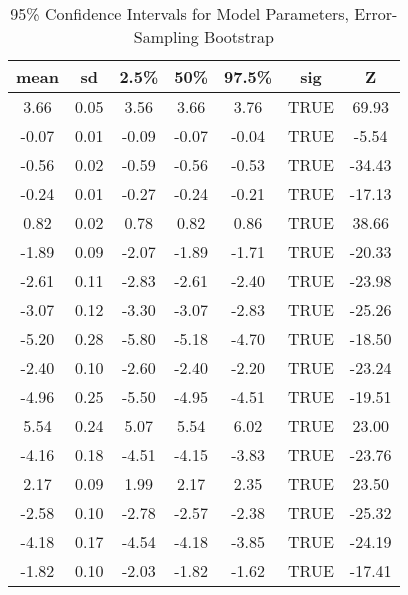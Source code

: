 \begin{table}[hbp!]
\centering
\begin{tabular}{|c|c|c|c|c|c|c|}
  \hline
\textbf{mean} & \textbf{sd} & \textbf{2.5\%} & \textbf{50\%} & \textbf{97.5\%} & \textbf{sig} & \textbf{Z} \\ 
  \hline
3.66 & 0.05 & 3.56 & 3.66 & 3.76 & TRUE & 69.93 \\ 
  -0.07 & 0.01 & -0.09 & -0.07 & -0.04 & TRUE & -5.54 \\ 
  -0.56 & 0.02 & -0.59 & -0.56 & -0.53 & TRUE & -34.43 \\ 
  -0.24 & 0.01 & -0.27 & -0.24 & -0.21 & TRUE & -17.13 \\ 
  0.82 & 0.02 & 0.78 & 0.82 & 0.86 & TRUE & 38.66 \\ 
  -1.89 & 0.09 & -2.07 & -1.89 & -1.71 & TRUE & -20.33 \\ 
  -2.61 & 0.11 & -2.83 & -2.61 & -2.40 & TRUE & -23.98 \\ 
  -3.07 & 0.12 & -3.30 & -3.07 & -2.83 & TRUE & -25.26 \\ 
  -5.20 & 0.28 & -5.80 & -5.18 & -4.70 & TRUE & -18.50 \\ 
  -2.40 & 0.10 & -2.60 & -2.40 & -2.20 & TRUE & -23.24 \\ 
  -4.96 & 0.25 & -5.50 & -4.95 & -4.51 & TRUE & -19.51 \\ 
  5.54 & 0.24 & 5.07 & 5.54 & 6.02 & TRUE & 23.00 \\ 
  -4.16 & 0.18 & -4.51 & -4.15 & -3.83 & TRUE & -23.76 \\ 
  2.17 & 0.09 & 1.99 & 2.17 & 2.35 & TRUE & 23.50 \\ 
  -2.58 & 0.10 & -2.78 & -2.57 & -2.38 & TRUE & -25.32 \\ 
  -4.18 & 0.17 & -4.54 & -4.18 & -3.85 & TRUE & -24.19 \\ 
  -1.82 & 0.10 & -2.03 & -1.82 & -1.62 & TRUE & -17.41 \\ 
   \hline
\end{tabular}
\caption{95\% Confidence Intervals for Model Parameters, Error-Sampling Bootstrap}
\end{table}
